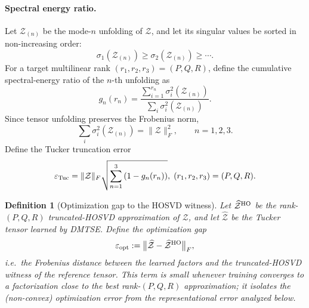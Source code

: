 \documentclass[11pt]{article}
\newtheorem{definition}{Definition}
\begin{document}
\paragraph{Spectral energy ratio.}
Let $\mathcal Z_{(n)}$ be the mode-$n$ unfolding of $\mathcal Z$, and let its singular values be sorted in non-increasing order:
\[
\sigma_1(\mathcal Z_{(n)})
\ge
\sigma_2(\mathcal Z_{(n)})
\ge
\cdots .
\]
For a target multilinear rank $(r_1,r_2,r_3)=(P,Q,R)$, define the cumulative spectral-energy ratio of the $n$-th unfolding as
\[
g_n(r_n)
=
\frac{
	\sum_{i=1}^{r_n}\sigma_i^2(\mathcal Z_{(n)})
}{
	\sum_i \sigma_i^2(\mathcal Z_{(n)})
}.
\]
Since tensor unfolding preserves the Frobenius norm,
\[
\sum_i \sigma_i^2(\mathcal Z_{(n)})
=
\|\mathcal Z\|_F^2,
\qquad n=1,2,3.
\]
Define the Tucker truncation error
\[
\varepsilon_{\rm Tuc}
=
\|\mathcal Z\|_F
\sqrt{
	\sum_{n=1}^{3}
	\left(1-g_n(r_n)\right)
},
\;
(r_1,r_2,r_3)=(P,Q,R).
\]

\begin{definition}[Optimization gap to the HOSVD witness]
	\label{def:opt_gap}
	Let $\widehat{\mathcal Z}^{\rm HO}$ be the rank-$(P,Q,R)$ truncated-HOSVD
	approximation of $\mathcal Z$, and let $\widehat{\mathcal Z}$ be the Tucker
	tensor learned by DMTSE. Define the optimization gap
	\[
	\varepsilon_{\rm opt}
	:=
	\bigl\|\widehat{\mathcal Z}-\widehat{\mathcal Z}^{\rm HO}\bigr\|_F ,
	\]
	i.e.\ the Frobenius distance between the learned factors and the
	truncated-HOSVD witness of the reference tensor. This term is small whenever
	training converges to a factorization close to the best rank-$(P,Q,R)$
	approximation; it isolates the (non-convex) optimization error from the
	representational error analyzed below.
\end{definition}
\end{document}
